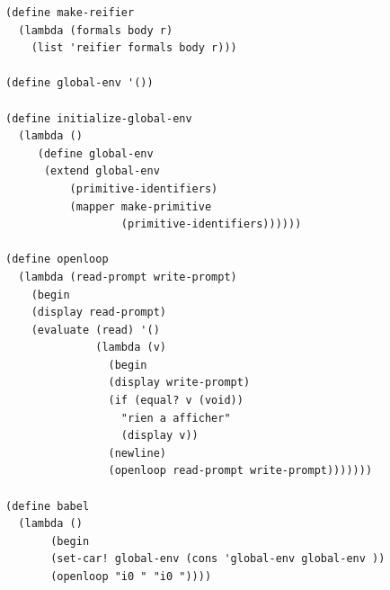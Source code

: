 \begin{footnotesize}
\begin{Verbatim}
(define make-reifier
  (lambda (formals body r)
    (list 'reifier formals body r)))

(define global-env '())

(define initialize-global-env
  (lambda ()
     (define global-env
      (extend global-env 
          (primitive-identifiers)
          (mapper make-primitive
                  (primitive-identifiers)))))) 

(define openloop
  (lambda (read-prompt write-prompt)
    (begin 
    (display read-prompt)
    (evaluate (read) '()
              (lambda (v)
                (begin
                (display write-prompt)
                (if (equal? v (void))
                  "rien a afficher"
                  (display v))
                (newline)
                (openloop read-prompt write-prompt)))))))

(define babel
  (lambda ()
       (begin
       (set-car! global-env (cons 'global-env global-env ))
       (openloop "i0 " "i0 "))))
\end{Verbatim}
\end{footnotesize}
